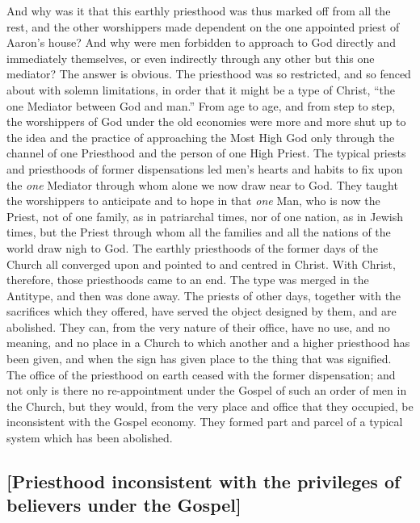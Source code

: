 \documentclass[
  english,
]{book}
\begin{document}
And why was it that this earthly priesthood was thus marked off from all the rest, and the other worshippers made dependent on the one appointed priest of Aaron's house? And why were men forbidden to approach to God directly and immediately themselves, or even indirectly through any other but this one mediator? The answer is obvious. The priesthood was so restricted, and so fenced about with solemn limitations, in order that it might be a type of Christ, ``the one Mediator between God and man.'' From age to age, and from step to step, the worshippers of God under the old economies were more and more shut up to the idea and the practice of approaching the Most High God only through the channel of one Priesthood and the person of one High Priest. The typical priests and priesthoods of former dispensations led men's hearts and habits to fix upon the \emph{one} Mediator through whom alone we now draw near to God. They taught the worshippers to anticipate and to hope in that \emph{one} Man, who is now the Priest, not of one family, as in patriarchal times, nor of one nation, as in Jewish times, but the Priest through whom all the families and all the nations of the world draw nigh to God. The earthly priesthoods of the former days of the Church all converged upon and pointed to and centred in Christ. With Christ, therefore, those priesthoods came to an end. The type was merged in the Antitype, and then was done away. The priests of other days, together with the sacrifices which they offered, have served the object designed by them, and are abolished. They can, from the very nature of their office, have no use, and no meaning, and no place in a Church to which another and a higher priesthood has been given, and when the sign has given place to the thing that was signified. The office of the priesthood on earth ceased with the former dispensation; and not only is there no re-appointment under the Gospel of such an order of men in the Church, but they would, from the very place and office that they occupied, be inconsistent with the Gospel economy. They formed part and parcel of a typical system which has been abolished.

\hypertarget{priesthood-inconsistent-with-the-privileges-of-believers-under-the-gospel}{%
\subsection{{[}Priesthood inconsistent with the privileges of believers under the Gospel{]}}\label{priesthood-inconsistent-with-the-privileges-of-believers-under-the-gospel}}
\end{document}
